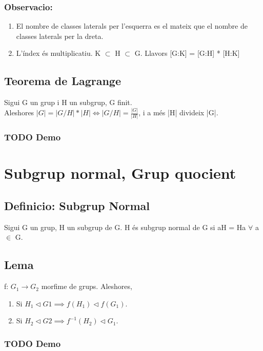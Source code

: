 \documentclass[11pt]{article}
\begin{document}
\subsubsection{Observacio:}
\label{sec:orgeb17027}
\begin{enumerate}
\item El nombre de classes laterals per l'esquerra es el mateix que el nombre de classes laterals per la dreta.
\item L'índex és multiplicatiu. K \(\subset\) H \(\subset\) G. Llavors [G:K] = [G:H] * [H:K]
\end{enumerate}

\subsection{Teorema de Lagrange}
\label{sec:orgc82c73d}
Sigui G un grup i H un subgrup, G finit. \\
Aleshores \(|G| = |G/H| * |H| \iff |G/H| = \frac{|G|}{|H|}\), i a més |H| divideix |G|.

\subsubsection{{\bfseries\sffamily TODO} Demo}
\label{sec:org01f10b5}

\section{Subgrup normal, Grup quocient}
\label{sec:orgfef0244}
\subsection{Definicio: Subgrup Normal}
\label{sec:org27bc38b}
Sigui G un grup, H un subgrup de G. H és subgrup normal de G si aH = Ha \(\forall\) a \(\in\) G.
\subsection{Lema}
\label{sec:orga570542}
f: \(G_1 \to G_2\) morfime de grups. Aleshores,
\begin{enumerate}
\item Si \(H_1 \vartriangleleft G1 \implies f(H_1) \vartriangleleft f(G_1)\).
\item Si \(H_2 \vartriangleleft G2 \implies f^{-1}(H_2) \vartriangleleft G_1\).
\end{enumerate}
\subsubsection{{\bfseries\sffamily TODO} Demo}
\label{sec:org01ea247}
\end{document}

